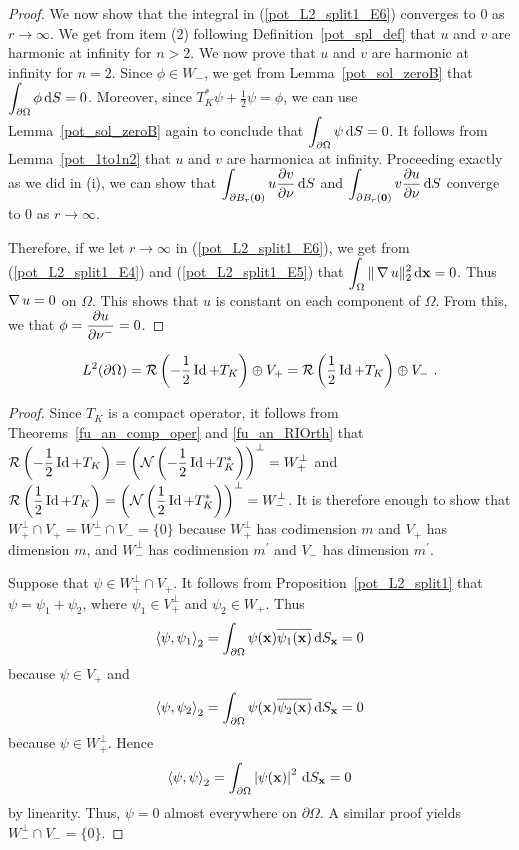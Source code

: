 \begin{proof}
We now show that the integral in (\ref{pot_L2_split1_E6}) converges
to $0$ as $r \to \infty$.  We get from item (2) following
Definition~\ref{pot_spl_def} that $u$ and $v$ are harmonic at infinity for
$n>2$.  We now prove that $u$ and $v$ are harmonic at infinity for $n=2$.
Since $\phi \in W_-$, we get from Lemma~\ref{pot_sol_zeroB} that
$\displaystyle \int_{\partial \Omega} \phi \,\mathrm{d}{S} = 0$.
Moreover, since $\displaystyle T^\ast_K \psi + \frac{1}{2} \psi = \phi$,
we can use Lemma~\ref{pot_sol_zeroB} again to conclude that
$\displaystyle \int_{\partial \Omega} \psi \,\mathrm{d}{S} = 0$.
It follows from Lemma~\ref{pot_1to1n2} that $u$ and $v$ are harmonica
at infinity.  Proceeding exactly as we did in (i), we can show that
$\displaystyle \int_{\partial B_r(\mathbf{0})} u \frac{\partial{v}}{\partial \mathbf{\nu}} \,\mathrm{d}{S}$
and
$\displaystyle \int_{\partial B_r(\mathbf{0})} v \frac{\partial{u}}{\partial \mathbf{\nu}}  \,\mathrm{d}{S}$
converge to $0$ as $r \to \infty$.

Therefore, if we let $r \to \infty$ in (\ref{pot_L2_split1_E6}), we
get from (\ref{pot_L2_split1_E4}) and (\ref{pot_L2_split1_E5}) that
$\displaystyle \int_{\Omega} \|\operatorname{\nabla} u\|_2^2 \,\mathrm{d}{\mathbf{x}} = 0$.
Thus $\operatorname{\nabla} u = 0$ on $\Omega$.  This shows that $u$ is
constant on each component of $\Omega$.  From this, we
that $\displaystyle \phi = \frac{\partial{u}}{\partial \mathbf{\nu}^-} = 0$.
\end{proof}

\begin{cor} \label{pot_cor_splitL2}
\[
L^2(\partial \Omega) = \IMG \left( -\frac{1}{2} \Id + T_K\right)
\oplus V_+ = \IMG \left( \frac{1}{2} \Id + T_K\right) \oplus V_- \ .
\]
\end{cor}

\begin{proof}
Since $\displaystyle T_K$ is a compact operator, it
follows from Theorems~\ref{fu_an_comp_oper} and \ref{fu_an_RIOrth} that\\
$\displaystyle  \mathcal{R} \left(-\frac{1}{2} \operatorname{Id} + T_K\right)
= \left( \mathcal{N} \left(-\frac{1}{2} \operatorname{Id} + T_K^\ast \right) \right)^\perp
= W_+^\perp$
and 
$\displaystyle \mathcal{R} \left(\frac{1}{2} \operatorname{Id} + T_K\right)
= \left( \mathcal{N} \left(\frac{1}{2} \operatorname{Id} + T_K^\ast \right) \right)^\perp
= W_-^\perp$.
It is therefore enough to show that
$\displaystyle W_+^\perp \cap V_+ = W_-^\perp \cap V_- = \{0\}$
because $\displaystyle W_+^\perp$ has codimension $m$ and $V_+$ has
dimension $m$, and $\displaystyle W_-^\perp$ has codimension
$\displaystyle m^{\prime}$ and $V_-$ has dimension $\displaystyle m^{\prime}$.

Suppose that $\displaystyle \psi \in W^\perp_+ \cap V_+$.  It follows from
Proposition~\ref{pot_L2_split1} that $\psi = \psi_1+\psi_2$, where
$\displaystyle \psi_1 \in V^\perp_+$ and $\psi_2 \in W_+$.  Thus
\[
\left\langle{\psi} , {\psi_1}\right\rangle_2 = \int_{\partial \Omega}
\psi(\mathbf{x})\overline{\psi_1(\mathbf{x})} \,\mathrm{d}{S}_{\mathbf{x}} = 0
\]
because $\psi \in V_+$ and
\[
\left\langle{\psi} , {\psi_2}\right\rangle_2 = \int_{\partial \Omega}
\psi(\mathbf{x})\overline{\psi_2(\mathbf{x})} \,\mathrm{d}{S}_{\mathbf{x}} = 0
\]
because $\psi \in W_+^\perp$.  Hence
\[
\left\langle{\psi} , {\psi}\right\rangle_2 = \int_{\partial \Omega}
\left| \psi(\mathbf{x}) \right|^2 \,\mathrm{d}{S}_{\mathbf{x}} = 0
\]
by linearity.  Thus, $\psi=0$ almost everywhere on $\partial \Omega$.
A similar proof yields $\displaystyle W_-^\perp \cap V_- = \{0\}$.
\end{proof}

